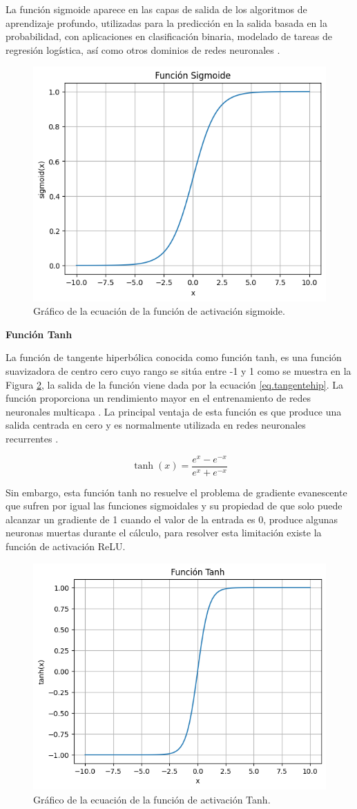 La función sigmoide aparece en las capas de salida de los algoritmos de aprendizaje profundo, utilizadas para la predicción en la salida basada en la probabilidad, con aplicaciones en clasificación binaria, modelado de tareas de regresión logística, así como otros dominios de redes neuronales \citep{glorot2010understanding}.

\begin{figure}[!h]
    \centering
    \includegraphics[width=.4\textwidth]{Imagenes/funcion_sigmoid.png}
    \caption{Gráfico de la ecuación de la función de activación sigmoide.}
    \label{fig:fun_sig}
\end{figure}

\textbf{Función Tanh}

La función de tangente hiperbólica conocida como función tanh, es una función suavizadora de centro cero cuyo rango se sitúa entre -1 y 1 como se muestra en la Figura \ref{fig:fun_tanh}, la salida de la función viene dada por la ecuación \ref{eq.tangentehip}. La función proporciona un rendimiento mayor en el entrenamiento de redes neuronales multicapa \citep{karlik2011performance, neal1992connectionist}. La principal ventaja de esta función es que produce una salida centrada en cero y es normalmente utilizada en redes neuronales recurrentes \citep{lecun2015deep}.

\begin{equation}
    \tanh(x) = \frac{e^x - e^{-x}}{e^x + e^{-x}}
    \label{eq.tangentehip}
\end{equation}

Sin embargo, esta función tanh no resuelve el problema de gradiente evanescente que sufren por igual las funciones sigmoidales y su propiedad de que solo puede alcanzar un gradiente de 1 cuando el valor de la entrada es 0, produce algunas neuronas muertas durante el cálculo, para resolver esta limitación existe la función de activación ReLU.

\begin{figure}[!h]
    \centering
    \includegraphics[width=.4\textwidth]{Imagenes/fun_tanh.png}
    \caption{Gráfico de la ecuación de la función de activación Tanh.}
    \label{fig:fun_tanh}
\end{figure}

